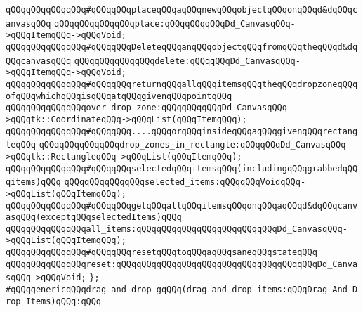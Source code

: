 \verb|qQQqqQQqqQQqqQQq#qQQqqQQqplaceqQQqaqQQqnewqQQqobjectqQQqonqQQqd&dqQQqcanvasqQQq|\newline
\verb|qQQqqQQqqQQqqQQqplace:qQQqqQQqqQQqDd_CanvasqQQq->qQQqItemqQQq->qQQqVoid;|\newline
\newline
\verb|qQQqqQQqqQQqqQQq#qQQqqQQqDeleteqQQqanqQQqobjectqQQqfromqQQqtheqQQqd&dqQQqcanvasqQQq|\newline
\verb|qQQqqQQqqQQqqQQqdelete:qQQqqQQqDd_CanvasqQQq->qQQqItemqQQq->qQQqVoid;|\newline
\newline
\verb|qQQqqQQqqQQqqQQq#qQQqqQQqreturnqQQqallqQQqitemsqQQqtheqQQqdropzoneqQQqofqQQqwhichqQQqisqQQqatqQQqgivenqQQqpointqQQq|\newline
\verb|qQQqqQQqqQQqqQQqover_drop_zone:qQQqqQQqqQQqDd_CanvasqQQq->qQQqtk::CoordinateqQQq->qQQqList(qQQqItemqQQq);|\newline
\verb|qQQqqQQqqQQqqQQq#qQQqqQQq....qQQqorqQQqinsideqQQqaqQQqgivenqQQqrectangleqQQq|\newline
\verb|qQQqqQQqqQQqqQQqdrop_zones_in_rectangle:qQQqqQQqDd_CanvasqQQq->qQQqtk::RectangleqQQq->qQQqList(qQQqItemqQQq);|\newline
\newline
\verb|qQQqqQQqqQQqqQQq#qQQqqQQqselectedqQQqitemsqQQq(includingqQQqgrabbedqQQqitems)qQQq|\newline
\verb|qQQqqQQqqQQqqQQqselected_items:qQQqqQQqVoidqQQq->qQQqList(qQQqItemqQQq);|\newline
\newline
\verb|qQQqqQQqqQQqqQQq#qQQqqQQqgetqQQqallqQQqitemsqQQqonqQQqaqQQqd&dqQQqcanvasqQQq(exceptqQQqselectedItems)qQQq|\newline
\verb|qQQqqQQqqQQqqQQqall_items:qQQqqQQqqQQqqQQqqQQqqQQqqQQqDd_CanvasqQQq->qQQqList(qQQqItemqQQq);|\newline
\newline
\verb|qQQqqQQqqQQqqQQq#qQQqqQQqresetqQQqtoqQQqaqQQqsaneqQQqstateqQQq|\newline
\verb|qQQqqQQqqQQqqQQqreset:qQQqqQQqqQQqqQQqqQQqqQQqqQQqqQQqqQQqqQQqDd_CanvasqQQq->qQQqVoid;|\newline
\newline
\verb|};|\newline
\newline
\newline
\newline
\verb|#qQQqgenericqQQqdrag_and_drop_gqQQq(drag_and_drop_items:qQQqDrag_And_Drop_Items)qQQq:qQQq|\newline
